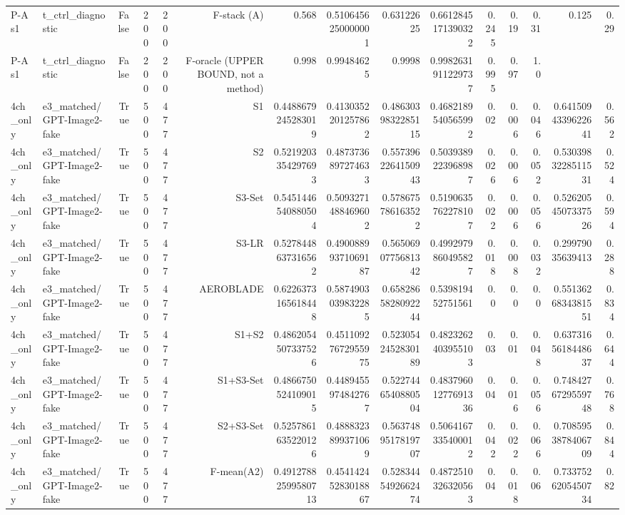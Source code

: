 \begin{table}[htbp]
\begin{tabular}{llrrrrrrrrrrrrr}
P-A s1 & t\_ctrl\_diagnostic & False & 200 & 200 & F-stack (A) & 0.568 & 0.5106456250000001 & 0.63122625 & 0.6612845171390322 & 0.245 & 0.19 & 0.31 & 0.125 & 0.29 \\
P-A s1 & t\_ctrl\_diagnostic & False & 200 & 200 & F-oracle (UPPER BOUND, not a method) & 0.998 & 0.99484625 & 0.9998 & 0.9982631911229737 & 0.995 & 0.97 & 1.0 &  &  \\
4ch\_only & e3\_matched/GPT-Image2-fake & True & 500 & 477 & S1 & 0.4488679245283019 & 0.4130352201257862 & 0.4863039832285115 & 0.4682189540565992 & 0.02 & 0.006 & 0.046 & 0.6415094339622641 & 0.562 \\
4ch\_only & e3\_matched/GPT-Image2-fake & True & 500 & 477 & S2 & 0.5219203354297693 & 0.4873736897274633 & 0.5573962264150943 & 0.5039389223968987 & 0.026 & 0.006 & 0.052 & 0.5303983228511531 & 0.524 \\
4ch\_only & e3\_matched/GPT-Image2-fake & True & 500 & 477 & S3-Set & 0.5451446540880504 & 0.5093271488469602 & 0.578675786163522 & 0.5190635762278107 & 0.022 & 0.006 & 0.056 & 0.5262054507337526 & 0.594 \\
4ch\_only & e3\_matched/GPT-Image2-fake & True & 500 & 477 & S3-LR & 0.5278448637316562 & 0.49008899371069187 & 0.5650690775681342 & 0.4992979860495827 & 0.018 & 0.008 & 0.032 & 0.29979035639413 & 0.288 \\
4ch\_only & e3\_matched/GPT-Image2-fake & True & 500 & 477 & AEROBLADE & 0.6226373165618448 & 0.5874903039832285 & 0.6582865828092244 & 0.539819452751561 & 0.0 & 0.0 & 0.0 & 0.5513626834381551 & 0.834 \\
4ch\_only & e3\_matched/GPT-Image2-fake & True & 500 & 477 & S1+S2 & 0.4862054507337526 & 0.45110927672955975 & 0.5230542452830189 & 0.4823262403955103 & 0.03 & 0.01 & 0.048 & 0.6373165618448637 & 0.644 \\
4ch\_only & e3\_matched/GPT-Image2-fake & True & 500 & 477 & S1+S3-Set & 0.4866750524109015 & 0.4489455974842767 & 0.5227446540880504 & 0.48379601277691336 & 0.04 & 0.016 & 0.056 & 0.7484276729559748 & 0.768 \\
4ch\_only & e3\_matched/GPT-Image2-fake & True & 500 & 477 & S2+S3-Set & 0.5257861635220126 & 0.4888323899371069 & 0.5637489517819707 & 0.5064167335400012 & 0.042 & 0.022 & 0.066 & 0.7085953878406709 & 0.844 \\
4ch\_only & e3\_matched/GPT-Image2-fake & True & 500 & 477 & F-mean(A2) & 0.49127882599580713 & 0.45414245283018867 & 0.5283445492662474 & 0.4872510326320563 & 0.04 & 0.018 & 0.06 & 0.7337526205450734 & 0.82 \\

\end{tabular}
\end{table}

